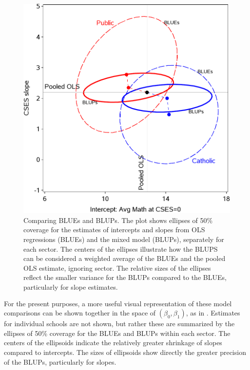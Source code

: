\begin{figure}[htb!]
  \centering
  \includegraphics[width=.6\textwidth,clip]{fig/hsbmix43}
  \caption{Comparing BLUEs and BLUPs. The plot shows ellipses of 50\% coverage for the estimates of intercepts and slopes
  from OLS regressions (BLUEs) and the mixed model (BLUPs), separately for each sector.
  The centers of the ellipses illustrate how the BLUPS can be considered a weighted average of the BLUEs and the
  pooled OLS estimate, ignoring sector. The relative sizes of the ellipses reflect the smaller variance for the
  BLUPs compared to the BLUEs, particularly for slope estimates. }%
  \label{fig:hsbmix43}
\end{figure}

For the present purposes, a more useful visual representation of these model comparisons can be shown together in
the space of $(\beta_0, \beta_1)$, as in .  Estimates for individual schools are not shown,
but rather these are summarized by the ellipses of 50\% coverage for the BLUEs and BLUPs within each sector.
The centers of the ellipsoids indicate the relatively greater shrinkage of slopes compared to intercepts.
The sizes of ellipsoids show directly the greater precision of the BLUPs, particularly for slopes.
